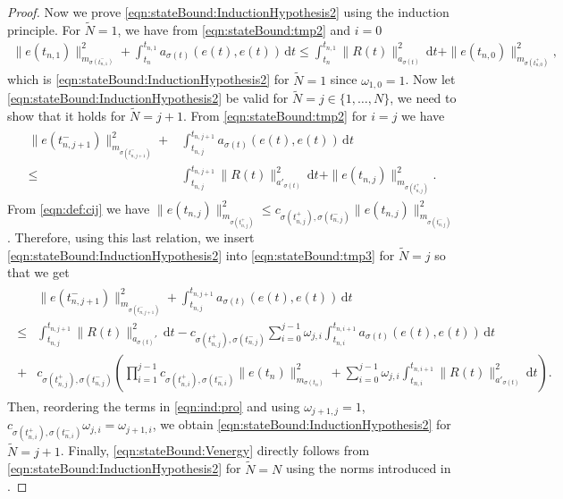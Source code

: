 \documentclass[reqno]{amsart}
\newcommand{\dt}{\,\mathrm{d}t}
\newcommand{\switch}{\sigma}
\newcommand{\nrSwitches}{N}
\newcommand{\residual}{R}
\begin{document}
\begin{proof}
    Now we prove \eqref{eqn:stateBound:InductionHypothesis2} using the induction principle. For $\tilde \nrSwitches=1$, we have from \eqref{eqn:stateBound:tmp2} and $i=0$
    \begin{align}
		\nonumber %
		\|e(t_{n,1})\|_{m_{\switch(t^{-}_{n,1})}}^2 + \int_{t_{n} }^{t_{n,1}}a_{\switch(t)}(e(t),e(t))\dt  \leq \int_{t_{n}}^{t_{n,1}} \|R(t)\|^2_{{{a_{\switch(t)}}}}\dt + \|e(t_{n,0})\|_{m_{\switch(t^{+}_{n,0})}}^2,
	\end{align}
    which is \eqref{eqn:stateBound:InductionHypothesis2} for $\tilde \nrSwitches =1$ since $\omega_{1,0}=1$.
    Now let \eqref{eqn:stateBound:InductionHypothesis2} be valid for $\tilde \nrSwitches=j\in\{1,\ldots,\nrSwitches\}$, we need to show that it holds for $\tilde \nrSwitches=j+1$. From \eqref{eqn:stateBound:tmp2} for $i=j$ we have
    \begin{align}
		\label{eqn:stateBound:tmp3}
  \begin{aligned}
		\|e(t^{-}_{n,j+1})\|_{m_{\switch(t^{-}_{n,j+1})}}^2 +& \int_{t_{n,j} }^{t_{n,j+1}}a_{\switch(t)}(e(t),e(t))\dt \\ 
  \leq &\int_{t_{n,j}}^{t_{n,j+1}} \|\residual(t)\|_{{{a'_{\switch(t)}}}}^2 \dt +
  \|e(t_{n,j})\|_{m_{\switch(t^{+}_{n,j})}}^2.
    \end{aligned}
	\end{align}
    From \eqref{eqn:def:cij} we have $\|e(t_{n,j})\|_{m_{\switch(t^{+}_{n,j})}}^2\leq c_{\switch(t^{+}_{n,j}),\switch(t^-_{n,j})}\|e(t_{n,j})\|_{m_{\switch(t^{-}_{n,j})}}^2$. Therefore, using this last relation, we insert \eqref{eqn:stateBound:InductionHypothesis2} into \eqref{eqn:stateBound:tmp3} for $\tilde \nrSwitches=j$ so that we get
    \begin{align}\label{eqn:ind:pro}
    \begin{aligned}
    &\|e(t^{-}_{n,j+1})\|_{m_{\switch(t^{-}_{n,j+1})}}^2 + \int_{t_{n,j} }^{t_{n,j+1}}a_{\switch(t)}(e(t),e(t))\dt\\
    \leq& \int_{t_{n,j}}^{t_{n,j+1}} \|R(t)\|^2_{a_{\switch(t)}'}\dt -c_{\switch(t^{+}_{n,j}),\switch(t^-_{n,j})} \sum\limits_{i=0}^{ j-1}\omega_{j,i}\int_{t_{n,i}}^{t_{n,i+1}}a_{\switch(t)}(e(t),e(t)) \dt\\
    +  &c_{\switch(t^{+}_{n,j}),\switch(t^-_{n,j})}\left( \prod\limits_{i=1}^{j-1}c_{\switch(t^{+}_{n,i}),\switch(t^{-}_{n,i})} \|e(t_n)\|_{m_{\switch(t_n)}}^2 
    + \sum\limits_{i=0}^{j-1}\omega_{j,i}\int_{t_{n,i}}^{t_{n,i+1}}\|\residual(t)\|_{{{a'_{\switch(t)}}}}^2 \dt\right).
    \end{aligned}	
     \end{align}
    Then, reordering the terms in \eqref{eqn:ind:pro} and using $\omega_{j+1,j}=1$, $c_{\switch(t^{+}_{n,i}),\switch(t^{-}_{n,i})} \omega_{j,i}=\omega_{j+1,i}$, we obtain \eqref{eqn:stateBound:InductionHypothesis2} for $\tilde \nrSwitches=j+1$. Finally, \eqref{eqn:stateBound:Venergy} directly follows from \eqref{eqn:stateBound:InductionHypothesis2} for $\tilde \nrSwitches=\nrSwitches$ using the norms introduced in . \qedhere
\end{proof}
\end{document}
